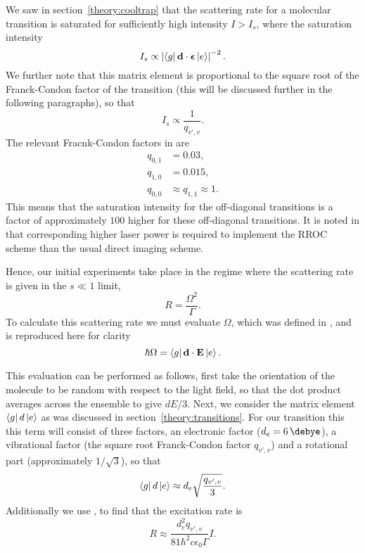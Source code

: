 We saw in section~\ref{theory:cooltrap} that the scattering rate for a
molecular transition is saturated for sufficiently high intensity $I>I_s$,
where the saturation intensity
%
\begin{equation}
  I_s \propto \left|\bra{g}\mathbf{d}\cdot\bm{\epsilon}\ket{e}\right|^{-2}.
\end{equation}
%
We further note that this matrix element is proportional to the square root of
the Franck-Condon factor of the transition (this will be discussed further in
the following paragraphs), so that
%
\begin{equation}
  I_s \propto \frac{1}{q_{v',v}}.
\end{equation}
%
The relevant Fracnk-Condon factors in \CaF{} are
%
\begin{align}
  q_{0,1} &= 0.03,\\
  q_{1,0} &= 0.015,\\
  q_{0,0} &\approx q_{1,1} \approx 1.
\end{align}
%
This means that the saturation intensity for the off-diagonal transitions is a
factor of approximately $100$ higher for these off-diagonal transitions. It is
noted in  that corresponding higher laser power is required
to implement the RROC scheme than the usual direct imaging scheme.

Hence, our initial experiments take place in the regime where the scattering
rate is given in the $s\ll1$ limit, 
%
\begin{equation}
  R = \frac{\Omega^2}{\Gamma}.
\end{equation}
%
To calculate this scattering rate we must evaluate $\Omega$, which was defined
in , and is reproduced here for clarity
%
\begin{equation}
  \centering
  \hbar \Omega = \bra{g}\mathbf{d}\cdot\mathbf{E}\ket{e}.
\end{equation}

This evaluation can be performed as follows, first take the orientation of
the molecule to be random with respect to the light field, so that the dot
product averages across the ensemble to give $dE/3$. Next, we consider the
matrix element $\bra{g}d\ket{e}$ as was discussed in
section~\ref{theory:transitions}. For our transition this this term will
consist of three factors, an electronic factor ($d_e=\SI{6}{\debye}$), a
vibrational factor (the square root Franck-Condon factor $q_{v',v}$) and a
rotational part (approximately $1/\sqrt{3}$), so that
%
\begin{equation}
  \bra{g}d\ket{e} \approx d_e\sqrt{\frac{q_{v', v}}{3}}.
\end{equation}
%
Additionally we use , to find that the excitation
rate is
%
\begin{equation}
  R \approx \frac{d_e^2 q_{v',v}}{81 \hbar^2 c \epsilon_0 \Gamma}I.
  \label{exper:eqn:actualscatterrate}
\end{equation}

